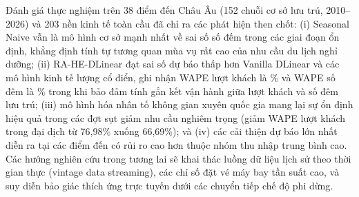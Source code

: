 \documentclass[10pt,journal,compsoc]{IEEEtran}
\begin{document}
Đánh giá thực nghiệm trên 38 điểm đến Châu Âu (152 chuỗi cơ sở lưu trú, 2010--2026) và 203 nền kinh tế toàn cầu đã chỉ ra các phát hiện then chốt: (i) Seasonal Naive vẫn là mô hình cơ sở mạnh nhất về sai số số đếm trong các giai đoạn ổn định, khẳng định tính tự tương quan mùa vụ rất cao của nhu cầu du lịch nghỉ dưỡng; (ii) RA-HE-DLinear đạt sai số dự báo thấp hơn Vanilla DLinear và các mô hình kinh tế lượng cổ điển, ghi nhận WAPE lượt khách là \ReviewerArrivalWAPE{}\% và WAPE số đêm là \ReviewerNightsWAPE{}\% trong khi bảo đảm tính gắn kết vận hành giữa lượt khách và số đêm lưu trú; (iii) mô hình hóa nhân tố không gian xuyên quốc gia mang lại sự ổn định hiệu quả trong các đợt sụt giảm nhu cầu nghiêm trọng (giảm WAPE lượt khách trong đại dịch từ 76,98\% xuống 66,69\%); và (iv) các cải thiện dự báo lớn nhất diễn ra tại các điểm đến có rủi ro cao hơn thuộc nhóm thu nhập trung bình cao. Các hướng nghiên cứu trong tương lai sẽ khai thác luồng dữ liệu lịch sử theo thời gian thực (vintage data streaming), các chỉ số đặt vé máy bay tần suất cao, và suy diễn bảo giác thích ứng trực tuyến dưới các chuyển tiếp chế độ phi dừng.
\end{document}
